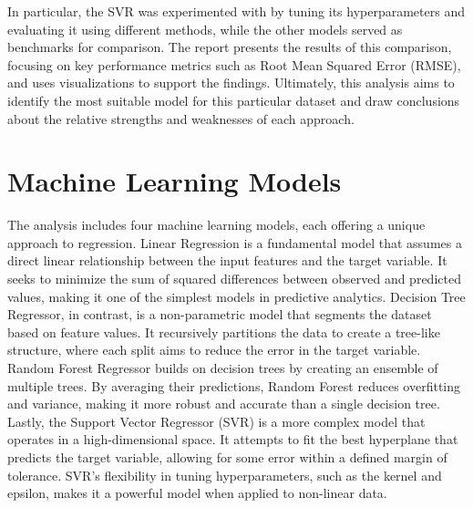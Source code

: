 \documentclass[conference]{IEEEtran}
\begin{document}
In particular, the SVR was experimented with by tuning its hyperparameters and evaluating it using different methods, while the other models served as benchmarks for comparison. The report presents the results of this comparison, focusing on key performance metrics such as Root Mean Squared Error (RMSE), and uses visualizations to support the findings. Ultimately, this analysis aims to identify the most suitable model for this particular dataset and draw conclusions about the relative strengths and weaknesses of each approach.

\section{Machine Learning Models}
The analysis includes four machine learning models, each offering a unique approach to regression. Linear Regression is a fundamental model that assumes a direct linear relationship between the input features and the target variable. It seeks to minimize the sum of squared differences between observed and predicted values, making it one of the simplest models in predictive analytics. Decision Tree Regressor, in contrast, is a non-parametric model that segments the dataset based on feature values. It recursively partitions the data to create a tree-like structure, where each split aims to reduce the error in the target variable. Random Forest Regressor builds on decision trees by creating an ensemble of multiple trees. By averaging their predictions, Random Forest reduces overfitting and variance, making it more robust and accurate than a single decision tree. Lastly, the Support Vector Regressor (SVR) is a more complex model that operates in a high-dimensional space. It attempts to fit the best hyperplane that predicts the target variable, allowing for some error within a defined margin of tolerance. SVR’s flexibility in tuning hyperparameters, such as the kernel and epsilon, makes it a powerful model when applied to non-linear data.
\end{document}
